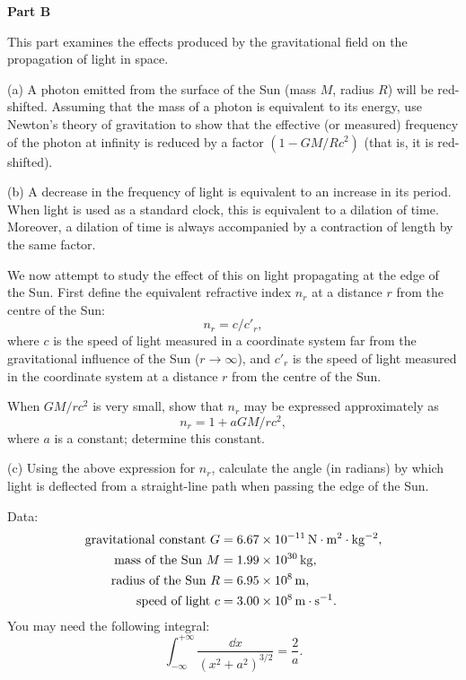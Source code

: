 \textbf{Part B}

This part examines the effects produced by the gravitational field on the propagation of light in space.

(a) A photon emitted from the surface of the Sun (mass $M$, radius $R$) will be red-shifted. Assuming that the mass of a photon is equivalent to its energy, use Newton's theory of gravitation to show that the effective (or measured) frequency of the photon at infinity is reduced by a factor $(1-GM/Rc^2)$ (that is, it is red-shifted).

(b) A decrease in the frequency of light is equivalent to an increase in its period. When light is used as a standard clock, this is equivalent to a dilation of time. Moreover, a dilation of time is always accompanied by a contraction of length by the same factor.

We now attempt to study the effect of this on light propagating at the edge of the Sun. First define the equivalent refractive index $n_r$ at a distance $r$ from the centre of the Sun:
\begin{equation*}
n_r=c/c'_r ,
\end{equation*}
where $c$ is the speed of light measured in a coordinate system far from the gravitational influence of the Sun ($r\to\infty$), and $c'_r$ is the speed of light measured in the coordinate system at a distance $r$ from the centre of the Sun.

When $GM/rc^2$ is very small, show that $n_r$ may be expressed approximately as
\begin{equation*}
n_r=1+aGM/rc^2 ,
\end{equation*}
where $a$ is a constant; determine this constant.

(c) Using the above expression for $n_r$, calculate the angle (in radians) by which light is deflected from a straight-line path when passing the edge of the Sun.

Data:
\begin{align*}
\text{gravitational constant } G&=6.67\times10^{-11}\,\mathrm{N\cdot m^2\cdot kg^{-2}},\\
\text{mass of the Sun } M&=1.99\times10^{30}\,\mathrm{kg},\\
\text{radius of the Sun } R&=6.95\times10^{8}\,\mathrm{m},\\
\text{speed of light } c&=3.00\times10^{8}\,\mathrm{m\cdot s^{-1}} .
\end{align*}
You may need the following integral:
\begin{equation*}
\int_{-\infty}^{+\infty}\frac{\dd x}{(x^2+a^2)^{3/2}}=\frac{2}{a} .
\end{equation*}

